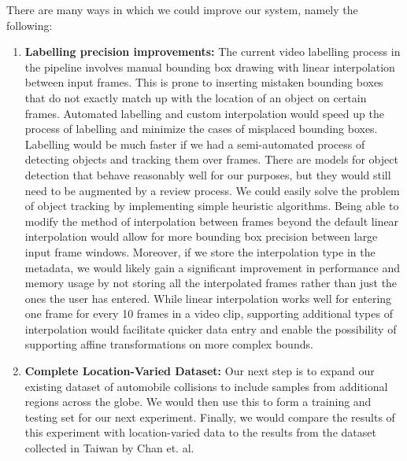 \documentclass[letterpaper, 10 pt, conference]{ieeeconf}
\begin{document}
There are many ways in which we could improve our system, namely the following:
\begin{enumerate}
\item \textbf{Labelling precision improvements:} The current video labelling process in the pipeline involves manual bounding box drawing with linear interpolation between input frames. This is prone to inserting mistaken bounding boxes that do not exactly match up with the location of an object on certain frames. Automated labelling and custom interpolation would speed up the process of labelling and minimize the cases of misplaced bounding boxes. Labelling would be much faster if we had a semi-automated process of detecting objects and tracking them over frames. There are models for object detection that behave reasonably well for our purposes, but they would still need to be augmented by a review process. We could easily solve the problem of object tracking by implementing simple heuristic algorithms. Being able to modify the method of interpolation between frames beyond the default linear interpolation would allow for more bounding box precision between large input frame windows. Moreover, if we store the interpolation type in the metadata, we would likely gain a significant improvement in performance and memory usage by not storing all the interpolated frames rather than just the ones the user has entered. While linear interpolation works well for entering one frame for every 10 frames in a video clip, supporting additional types of interpolation would facilitate quicker data entry and enable the possibility of supporting affine transformations on more complex bounds.

\item \textbf{Complete Location-Varied Dataset:} Our next step is to expand our existing dataset of automobile collisions to include samples from additional regions across the globe. We would then use this to form a training and testing set for our next experiment. Finally, we would compare the results of this experiment with location-varied data to the results from the dataset collected in Taiwan by Chan et. al.

\end{enumerate}

\addtolength{\textheight}{-12cm}


\nocite{*}


\end{document}
